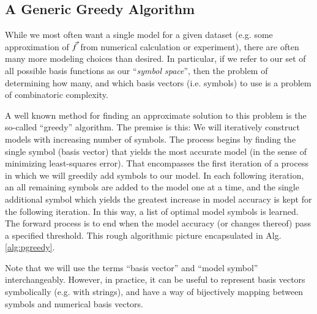 \documentclass[twocolumn,aps,prd,floatfix,preprintnumbers,a4paper,nofootinbib,
superscriptaddress,10pt]{revtex4-1}
\begin{document}
\subsection{A Generic Greedy Algorithm}
%
While we most often want a single model for a given dataset (e.g. some approximation of $\vec{f}$ from numerical calculation or experiment), there are often many more modeling choices than desired.
%
In particular, if we refer to our set of all possible basis functions as our ``\textit{symbol space}'', then the problem of determining how many, and which basis vectors (i.e. symbols) to use is a problem of combinatoric complexity.
%
\par A well known method for finding an approximate solution to this problem is the so-called ``greedy'' algorithm.
%
The premise is this:
%
We will iteratively construct models with increasing number of symbols.
%
The process begins by finding the single symbol (basis vector) that yields the most accurate model (in the sense of minimizing least-squares error).
%
That encompasses the first iteration of a process in which we will greedily add symbols to our model.
%
In each following iteration, an all remaining symbols are added to the model one at a time, and the single additional symbol which yields the greatest increase in model accuracy is kept for the following iteration.
%
In this way, a list of optimal model symbols is learned.
%
The forward process is to end when the model accuracy (or changes thereof) pass a specified threshold.
%
This rough algorithmic picture encapsulated in Alg. \ref{alg:pgreedy}.
%
\par Note that we will use the terms ``basis vector'' and ``model symbol'' interchangeably. However, in practice, it can be useful to represent basis vectors symbolically (e.g. with strings), and have a way of bijectively mapping between symbols and numerical basis vectors.
%
%
\hspace{1cm}
\def\pgreedy{\texttt{PGREEDY}}
\end{document}
